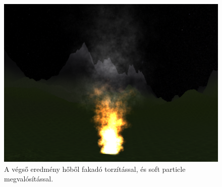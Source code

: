 



\begin{figure}[h]
 \centering
 \includegraphics[width=\textwidth]{kepek/particleFinal.png}
 \caption{A végső eredmény hőből fakadó torzítással, és soft particle megvalósítással.}
 \label{fig:particleFinal}
\end{figure}